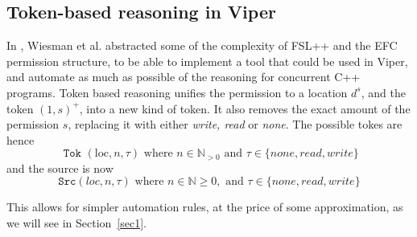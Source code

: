 \subsection{Token-based reasoning in Viper}
In \cite{pascal}, Wiesman et al. abstracted some of the complexity of FSL++ and the EFC permission structure, to be able to implement a tool that could be used in Viper, and automate as much as possible of the reasoning for concurrent C++ programs. Token based reasoning unifies the permission to a location $d^s$, and the token $(1, s)^+$, into a new kind of token. It also removes the exact amount of the permission $s$, replacing it with either \emph{write, read} or \emph{none}. The possible tokes are hence 
\[\texttt { Tok }(\text {loc}, n, \tau) \text { where } n \in \mathbb{N}_{>0} \text { and } \tau \in\{ {none, read, write}\}\]
and the source is now 
\[\texttt{Src}(l o c, n, \tau) \text { where } n \in \mathbb{N} \geq 0, \text { and } \tau \in\{ {none, read, write}\}\]

This allows for simpler automation rules, at the price of some approximation, as we will see in Section~\ref{sec1}.

